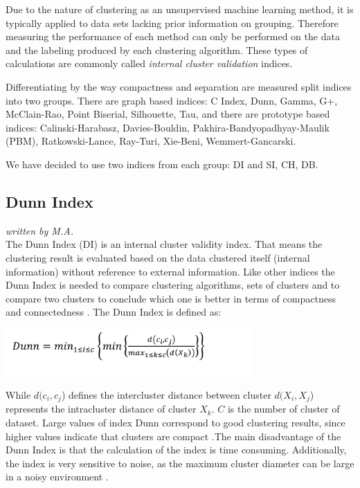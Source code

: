 Due to the nature of clustering as an unsupervised machine learning method, it is typically applied to data sets lacking prior information on grouping. Therefore measuring the performance of each method can only be performed on the data and the labeling produced by each clustering algorithm. These types of calculations are commonly called \textit{internal cluster validation} indices.

Differentiating by the way compactness and separation are measured \cite{balbi2016cosine} split indices into two groups. There are graph based indices: C Index, Dunn, Gamma, G+, McClain-Rao, Point Biserial, Silhouette, Tau, and there are prototype based indices: Calinski-Harabasz, Davies-Bouldin, Pakhira-Bandyopadhyay-Maulik (PBM), Ratkowski-Lance, Ray-Turi, Xie-Beni, Wemmert-Gancarski. 

We have decided to use two indices from each group: \gls{DI} and \gls{SI}, \gls{CH}, \gls{DB}.


\subsection{Dunn Index}
\textit{written by M.A.}\\


The Dunn Index (DI) is an internal cluster validity index. That means the clustering result is evaluated based on the data clustered itself (internal information) without reference to external information. Like other indices the Dunn Index is needed to compare clustering algorithms, sets of clusters and to compare two clusters to conclude which one is better in terms of compactness and connectedness \cite{dunn-website}.
The Dunn Index is defined as: \newline

\includegraphics[width=0.7\textwidth]{images/dunn.png}
    
While $d(c_{i},c_{j}$) defines the intercluster distance between cluster $d(X_{i},X_{j}$) represents the intracluster distance of cluster $X_{k}$. \newline
$C$ is the number of cluster of dataset.
Large values of index Dunn correspond to good clustering results, since higher values indicate that clusters are compact \cite{ballarin2015cluster}.The main disadvantage of the Dunn Index is that the calculation of the index is time consuming. Additionally, the index is very sensitive to noise, as the maximum cluster diameter can be large in a noisy environment \cite{ballarin2015cluster,rendon2011internal}. \newline

